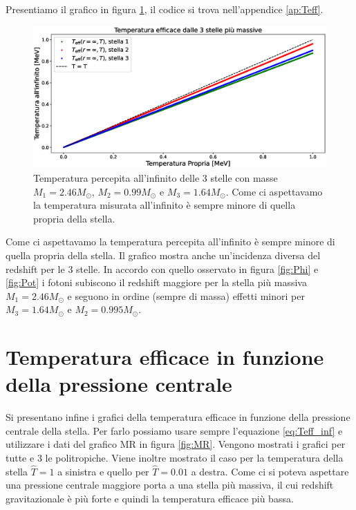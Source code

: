 \documentclass[a4paper, titlepage]{article}
\begin{document}
Presentiamo il grafico in figura \ref{fig:Teff}, il codice si trova
nell'appendice \ref{ap:Teff}.

\begin{figure}[h]
    \centering
    \includegraphics[width = \textwidth]{Figures/Teff.eps}
    \caption{Temperatura percepita all'infinito delle 3 stelle con masse
    $M_1 = 2.46 M_\odot$, $M_2 = 0.99 M_\odot$ e $M_3 = 1.64 M_\odot$.
    Come ci aspettavamo la temperatura misurata all'infinito è sempre minore di
    quella propria della stella.}
    \label{fig:Teff}
\end{figure}

Come ci aspettavamo la temperatura percepita all'infinito è sempre minore di
quella propria della stella.
Il grafico mostra anche un'incidenza diversa del redshift per le 3 stelle.
In accordo con quello osservato in figura \ref{fig:Phi} e \ref{fig:Pot} i fotoni
subiscono il redshift maggiore per la stella più massiva $M_1 = 2.46 M_\odot$ e
seguono in ordine (sempre di massa) effetti minori per
$M_3 = 1.64 M_\odot$ e $M_2 = 0.995 M_\odot$.


\section{Temperatura efficace in funzione della pressione centrale}

Si presentano infine i grafici della temperatura efficace in funzione della
pressione centrale della stella.
Per farlo possiamo usare sempre l'equazione \ref{eq:Teff_inf} e utilizzare i
dati del grafico MR in figura \ref{fig:MR}.
Vengono mostrati i grafici per tutte e 3 le politropiche.
Viene inoltre mostrato il caso per la temperatura della stella $\hat T = 1$ a
sinistra e quello per $\hat T = 0.01$ a destra.
Come ci si poteva aspettare una pressione centrale maggiore porta a una stella
più massiva, il cui redshift gravitazionale è più forte e quindi la temperatura
efficace più bassa.
\end{document}
